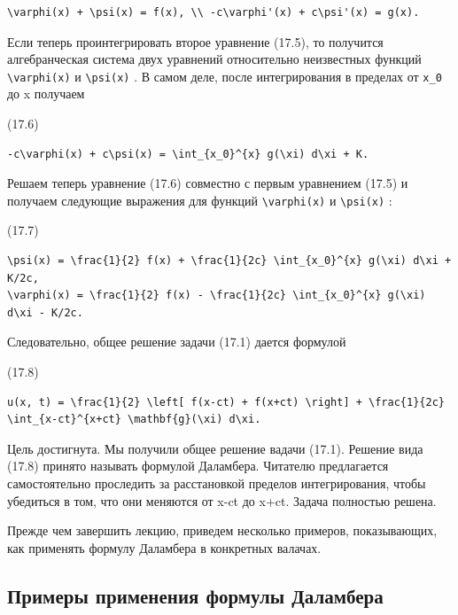 \documentclass[
  ukrainian,
]{article}
\begin{document}
\begin{verbatim}
\varphi(x) + \psi(x) = f(x), \\ -c\varphi'(x) + c\psi'(x) = g(x).
\end{verbatim}

Если теперь проинтегрировать второе уравнение (17.5), то получится
алгебранческая система двух уравнений относительно неизвестных функций
\texttt{\textbackslash{}varphi(x)} и \texttt{\textbackslash{}psi(x)} . В
самом деле, после интегрирования в пределах от \texttt{x\_0} до x
получаем

(17.6)

\begin{verbatim}
-c\varphi(x) + c\psi(x) = \int_{x_0}^{x} g(\xi) d\xi + K.
\end{verbatim}

Решаем теперь уравнение (17.6) совместно с первым уравнением (17.5) и
получаем следующие выражения для функций
\texttt{\textbackslash{}varphi(x)} и \texttt{\textbackslash{}psi(x)} :

(17.7)

\begin{verbatim}
\psi(x) = \frac{1}{2} f(x) + \frac{1}{2c} \int_{x_0}^{x} g(\xi) d\xi + K/2c,
\varphi(x) = \frac{1}{2} f(x) - \frac{1}{2c} \int_{x_0}^{x} g(\xi) d\xi - K/2c.
\end{verbatim}

Следовательно, общее решение задачи (17.1) дается формулой

(17.8)

\begin{verbatim}
u(x, t) = \frac{1}{2} \left[ f(x-ct) + f(x+ct) \right] + \frac{1}{2c} \int_{x-ct}^{x+ct} \mathbf{g}(\xi) d\xi.
\end{verbatim}

Цель достигнута. Мы получили общее решение вадачи (17.1). Решение вида
(17.8) принято называть формулой Даламбера. Читателю предлагается
самостоятельно проследить за расстановкой пределов интегрирования, чтобы
убедиться в том, что они меняются от x-ct до x+ct. Задача полностью
решена.

Прежде чем завершить лекцию, приведем несколько примеров, показывающих,
как применять формулу Даламбера в конкретных валачах.

\subsection{Примеры применения формулы
Даламбера}\label{ux43fux440ux438ux43cux435ux440ux44b-ux43fux440ux438ux43cux435ux43dux435ux43dux438ux44f-ux444ux43eux440ux43cux443ux43bux44b-ux434ux430ux43bux430ux43cux431ux435ux440ux430}
\end{document}
